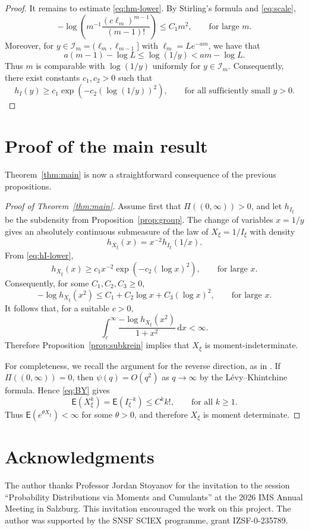 \documentclass[11pt]{article}
\newcommand{\E}{\mathsf E}
\newcommand{\1}{\mathbf 1}
\newcommand{\dd}{\mathrm d}
\begin{document}
\begin{proof}
It remains to estimate \eqref{eq:hm-lower}. By Stirling's formula and \eqref{eq:scale},
\[
 -\log\left(
 m^{-1}\frac{(c\ell_m)^{m-1}}{(m-1)!}
 \right)
 \leq C_1m^2,
 \qquad \text{for large $m$.}
\]
Moreover, for $y\in\mathcal I_m=(\ell_m,\ell_{m-1}]$ with $\ell_m=Le^{-am}$, we have that
\[
 a(m-1)-\log L
 \leq
 \log(1/y)
 <
 am-\log L.
\]
Thus $m$ is comparable with $\log(1/y)$ uniformly for $y\in\mathcal I_m$. Consequently, there exist constants $c_1,c_2>0$ such that \[ h_I(y)\geq c_1\exp\left(-c_2(\log(1/y))^2\right), \qquad \text{for all sufficiently small }y>0. \]
\end{proof}
\section{Proof of the main result}

Theorem~\ref{thm:main} is now a straightforward consequence of the previous propositions.

\begin{proof}[Proof of Theorem~\ref{thm:main}]
Assume first that $\Pi((0,\infty))>0$, and let $h_{I_\xi}$ be the subdensity from Proposition~\ref{prop:group}. The change of variables $x=1/y$ gives an absolutely continuous submeasure of the law of $X_\xi=1/I_\xi$ with density
\[
 h_{X_\xi}(x)=x^{-2}h_{I_\xi}(1/x).
\]
From \eqref{eq:hI-lower},
\[
 h_{X_\xi}(x)\geq c_1x^{-2}\exp\left(-c_2(\log x)^2\right),
 \qquad
 \text{for large }x.
\]
Consequently, for some $C_1,C_2,C_3\geq0$,
\[
 -\log h_{X_\xi}(x^2)
 \leq
 C_1+C_2\log x+C_3(\log x)^2,
 \qquad
 \text{for large }x.
\]
It follows that, for a suitable $c>0$,
\[
 \int_c^\infty \frac{-\log h_{X_\xi}(x^2)}{1+x^2}\,\dd x<\infty.
\]
Therefore Proposition~\ref{prop:subkrein} implies that $X_\xi$ is moment-indeterminate.

For completeness, we recall the argument for the reverse direction, as in \cite{Bertoin-Yor-2002}. If $\Pi((0,\infty))=0$, then $\psi(q)=O(q^2)$ as $q\to\infty$ by the L\'evy--Khintchine formula. Hence \eqref{eq:BY} gives
\[
 \E(X_\xi^k)=\E(I_\xi^{-k})\leq C^k k!,
 \qquad
 \text{for all }k\geq1.
\]
Thus $\E(e^{\theta X_\xi})<\infty$ for some $\theta>0$, and therefore $X_\xi$ is moment determinate.
\end{proof}
\section*{Acknowledgments}


The author thanks Professor Jordan  Stoyanov for the invitation to the session
``Probability Distributions via Moments and Cumulants'' at the 2026 IMS Annual Meeting in Salzburg. This invitation encouraged the work on this project. The author was supported by the SNSF SCIEX programme, grant IZSF-0-235789.





\end{document}
